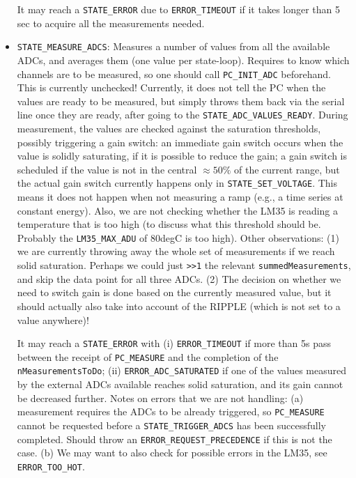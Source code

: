 \documentclass[11pt,a4paper,english]{article}
\begin{document}
\begin{itemize}
	It may reach a \texttt{STATE\_ERROR} due to \texttt{ERROR\_TIMEOUT} if it takes longer than 5 sec to acquire all the measurements needed.

\item \texttt{STATE\_MEASURE\_ADCS}: Measures a number of values from all the available ADCs, and averages them (one value per state-loop). Requires to know which channels are to be measured, so one should call \texttt{PC\_INIT\_ADC} beforehand. This is currently unchecked! Currently, it does not tell the PC when the values are ready to be measured, but simply throws them back via the serial line once they are ready, after going to the \texttt{STATE\_ADC\_VALUES\_READY}. During measurement, the values are checked against the saturation thresholds, possibly triggering a gain switch: an immediate gain switch occurs when the value is solidly saturating, if it is possible to reduce the gain; a gain switch is scheduled if the value is not in the central $\approx50\%$ of the current range, but the actual gain switch currently happens only in \texttt{STATE\_SET\_VOLTAGE}. This means it does not happen when not measuring a ramp (e.g., a time series at constant energy). Also, we are not checking whether the LM35 is reading a temperature that is too high (to discuss what this threshold should be. Probably the \texttt{LM35\_MAX\_ADU} of 80degC is too high). Other observations: (1) we are currently throwing away the whole set of measurements if we reach solid saturation. Perhaps we could just \texttt{>>1} the relevant \texttt{summedMeasurements}, and skip the data point for all three ADCs. (2) The decision on whether we need to switch gain is done based on the currently measured value, but it should actually also take into account of the RIPPLE (which is not set to a value anywhere)!

	It may reach a \texttt{STATE\_ERROR} with (i) \texttt{ERROR\_TIMEOUT} if more than 5s pass between the receipt of  \texttt{PC\_MEASURE} and the completion of the \texttt{nMeasurementsToDo}; (ii) \texttt{ERROR\_ADC\_SATURATED} if one of the values measured by the external ADCs available reaches solid saturation, and its gain cannot be decreased further. Notes on errors that we are not handling: (a) measurement requires the ADCs to be already triggered, so \texttt{PC\_MEASURE} cannot be requested before a \texttt{STATE\_TRIGGER\_ADCS} has been successfully completed. Should throw an \texttt{ERROR\_REQUEST\_PRECEDENCE} if this is not the case. (b) We may want to also check for possible errors in the LM35, see \texttt{ERROR\_TOO\_HOT}.


\end{itemize}
\end{document}
